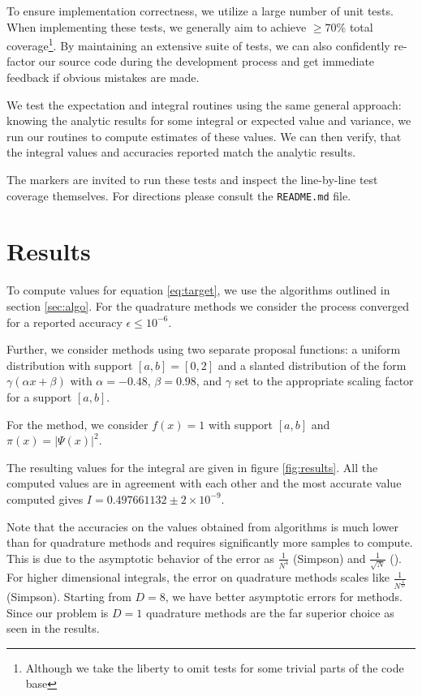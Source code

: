 \documentclass[10pt, a4paper]{article}
\newcommand{\final}{$I = 0.497661132 \pm 2\times10^{-9}$}
\begin{document}
  To ensure implementation correctness, we utilize a large number of unit tests. When implementing these
  tests, we generally aim to achieve $\ge 70\%$ total coverage\footnote{Although we take the liberty
  to omit tests for some trivial parts of the code base}. By maintaining an extensive suite of tests,
  we can also confidently re-factor our source code during the development process and get immediate
  feedback if obvious mistakes are made.

  We test the expectation and integral routines using the same general approach: knowing the analytic
  results for some integral or expected value and variance, we run our routines to compute estimates
  of these values. We can then verify, that the integral values and accuracies reported match the
  analytic results.

  The markers are invited to run these tests and inspect the line-by-line test coverage themselves.
  For directions please consult the \texttt{README.md} file.

\section{Results}
  To compute values for equation \ref{eq:target}, we use the algorithms outlined in section \ref{sec:algo}.
  For the quadrature methods we consider the process converged for a reported accuracy $\epsilon \le 10^{-6}$.

  Further, we consider \is{} methods using two separate proposal functions: a uniform distribution with
  support $[a,b] = [0,2]$ and a slanted distribution of the form $\gamma(\alpha x + \beta)$ with $\alpha = -0.48$,
  $\beta = 0.98$, and $\gamma$ set to the appropriate scaling factor for a support $[a,b]$.

  For the \apis{} method, we consider $f(x) = 1$ with support $[a,b]$ and $\pi(x) = |\Psi(x)|^2$.

  The resulting values for the integral are given in figure \ref{fig:results}. All the computed values
  are in agreement with each other and the most accurate value computed gives \final.

  Note that the accuracies on the values obtained from \is{} algorithms is much lower than for quadrature
  methods and requires significantly more samples to compute. This is due to the asymptotic behavior of
  the error as $\frac{1}{N^4}$ (Simpson) and $\frac{1}{\sqrt{N}}$ (\is). For higher dimensional integrals,
  the error on quadrature methods scales like $\frac{1}{N^{\frac4D}}$ (Simpson). Starting from $D=8$, we have
  better asymptotic errors for \is{} methods. Since our problem is $D=1$ quadrature methods are
  the far superior choice as seen in the results.
\end{document}
